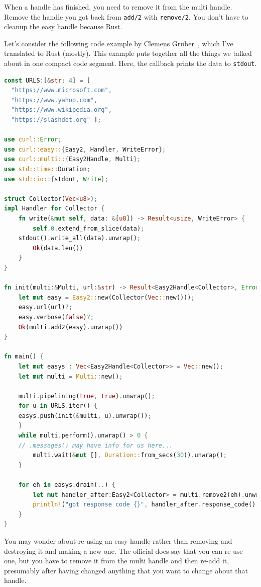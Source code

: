 \documentclass[a4paper]{report}
\begin{document}
When a handle has finished, you need to remove it from the multi handle. Remove the handle you got back from \texttt{add/2} with \texttt{remove/2}. You don't have to cleanup the easy handle because Rust.

Let's consider the following code example by Clemens Gruber~\cite{curlmulti}, which I've translated to Rust (mostly). This example puts together all the things we talked about in one compact code segment. Here, the callback prints the data to \texttt{stdout}.

\begin{lstlisting}[language=Rust]
const URLS:[&str; 4] = [
  "https://www.microsoft.com",
  "https://www.yahoo.com",
  "https://www.wikipedia.org",
  "https://slashdot.org" ];

use curl::Error;
use curl::easy::{Easy2, Handler, WriteError};
use curl::multi::{Easy2Handle, Multi};
use std::time::Duration;
use std::io::{stdout, Write};

struct Collector(Vec<u8>);
impl Handler for Collector {
    fn write(&mut self, data: &[u8]) -> Result<usize, WriteError> {
        self.0.extend_from_slice(data);
	stdout().write_all(data).unwrap();
        Ok(data.len())
    }
}

fn init(multi:&Multi, url:&str) -> Result<Easy2Handle<Collector>, Error> {
    let mut easy = Easy2::new(Collector(Vec::new()));
    easy.url(url)?;
    easy.verbose(false)?;
    Ok(multi.add2(easy).unwrap())
}

fn main() {
    let mut easys : Vec<Easy2Handle<Collector>> = Vec::new();
    let mut multi = Multi::new();
    
    multi.pipelining(true, true).unwrap();
    for u in URLS.iter() {
	easys.push(init(&multi, u).unwrap());
    }
    while multi.perform().unwrap() > 0 {
	// .messages() may have info for us here...
        multi.wait(&mut [], Duration::from_secs(30)).unwrap();
    }

    for eh in easys.drain(..) {
    	let mut handler_after:Easy2<Collector> = multi.remove2(eh).unwrap();
        println!("got response code {}", handler_after.response_code().unwrap());
    }
}
\end{lstlisting}

You may wonder about re-using an easy handle rather than removing and destroying it and making a new one. The official docs say that you can re-use one, but you have to remove it from the multi handle and then re-add it, presumably after having changed anything that you want to change about that handle. 
\end{document}
